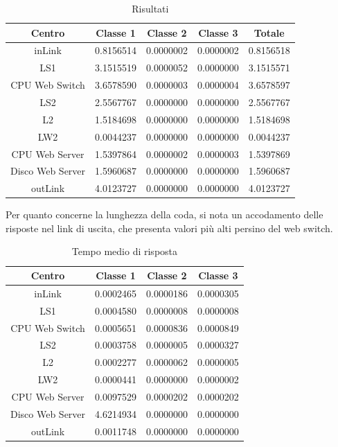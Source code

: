 \begin{table}[H]
\begin{center}
\begin{tabular}{||c|c|c|c|c||}
\hline
Centro	&Classe 1	&Classe 2	&Classe 3	&Totale\\
\hline
\hline
inLink	&0.8156514		&0.0000002		&0.0000002		&0.8156518\\
\hline
LS1	&3.1515519		&0.0000052		&0.0000000		&3.1515571\\
\hline
CPU Web Switch	&3.6578590		&0.0000003		&0.0000004		&3.6578597\\
\hline
LS2	&2.5567767		&0.0000000		&0.0000000		&2.5567767\\
\hline
L2		&1.5184698		&0.0000000		&0.0000000		&1.5184698\\
\hline
LW2	&0.0044237		&0.0000000		&0.0000000		&0.0044237\\
\hline
CPU Web Server	&1.5397864		&0.0000002		&0.0000003		&1.5397869\\
\hline
Disco Web Server	&1.5960687		&0.0000000		&0.0000000		&1.5960687\\
\hline
outLink		&4.0123727		&0.0000000		&0.0000000		&4.0123727\\
\hline
\end{tabular}
\end{center}
\caption{Risultati}
\label{ris}
\end{table}
Per quanto concerne la lunghezza della coda, si nota un accodamento delle risposte nel link di uscita, che presenta valori più alti persino del web switch.
\begin{table}[htbp]
\caption{Tempo medio di risposta}
\begin{center}
\begin{tabular}{|c|c|c|c|}
\hline
Centro	&Classe 1	&Classe 2	&Classe 3\\
\hline
\hline
inLink & 0.0002465 & 0.0000186 & 0.0000305 \\ \hline
LS1 & 0.0004580 & 0.0000008 & 0.0000008 \\ \hline
CPU Web Switch & 0.0005651 & 0.0000836 & 0.0000849 \\ \hline
LS2 & 0.0003758 & 0.0000005 & 0.0000327 \\ \hline
L2 & 0.0002277 & 0.0000062 & 0.0000005 \\ \hline
LW2 & 0.0000441 & 0.0000000 & 0.0000002 \\ \hline
CPU Web Server & 0.0097529 & 0.0000202 & 0.0000202 \\ \hline
Disco Web Server & 4.6214934 & 0.0000000 & 0.0000000 \\ \hline
outLink & 0.0011748 & 0.0000000 & 0.0000000 \\ \hline
\end{tabular}
\end{center}
\label{tempomediorisposta}
\end{table}
